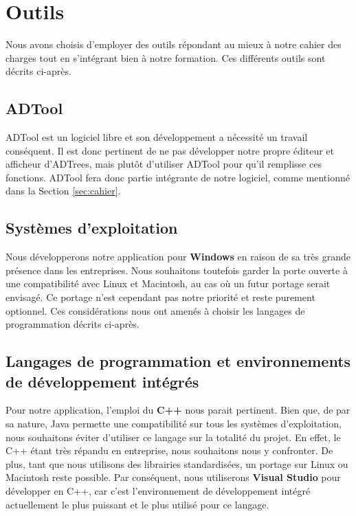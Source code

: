 \section{Outils}
    \label{sec:outils}
    	
		Nous avons choisis d'employer des outils répondant au mieux à notre cahier des charges tout en s'intégrant bien à notre formation.  Ces différents outils sont décrits ci-après.
    	
    \subsection{ADTool}
    	ADTool est un logiciel libre et son développement a nécessité un travail conséquent. Il est donc pertinent de ne pas développer notre propre éditeur et afficheur d'ADTrees, mais plutôt d'utiliser ADTool pour qu'il remplisse ces fonctions. ADTool fera donc partie intégrante de notre logiciel, comme mentionné dans la Section \ref{sec:cahier}.

	\subsection{Systèmes d'exploitation}
	   Nous développerons notre application pour {\bf Windows} en raison de sa très grande présence dans les entreprises. Nous souhaitons toutefois garder la porte ouverte à une compatibilité avec Linux et Macintosh, au cas où un futur portage serait envisagé. Ce portage n'est cependant pas notre priorité et reste purement optionnel. Ces considérations nous ont amenés à choisir les langages de programmation décrits ci-après.
	
    \subsection{Langages de programmation et environnements de développement intégrés}
        Pour notre application, l'emploi du {\bf C++} nous parait pertinent. Bien que, de par sa nature, Java permette une compatibilité sur tous les systèmes d'exploitation, nous souhaitons éviter d'utiliser ce langage sur la totalité du projet. En effet, le C++ étant très répandu en entreprise, nous souhaitons nous y confronter. De plus, tant que nous utilisons des librairies standardisées, un portage sur Linux ou Macintosh reste possible. Par conséquent, nous utiliserons {\bf Visual Studio} pour développer en C++, car c'est l'environnement de développement intégré actuellement le plus puissant et le plus utilisé pour ce langage.
        
